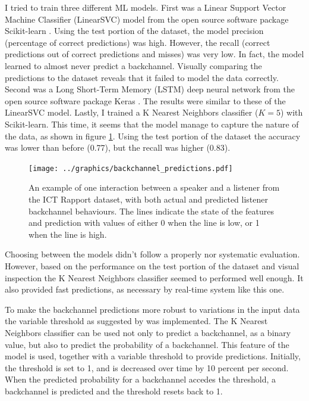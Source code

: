 \documentclass[]{simple-thesis}
\begin{document}
I tried to train three different ML models.
First was a Linear Support Vector Machine Classifier (LinearSVC) model from the open source software package Scikit-learn \citep{Pedregosa2011}.
Using the test portion of the dataset, the model precision (percentage of correct predictions) was high.
However, the recall (correct predictions out of correct predictions and misses) was very low.
In fact, the model learned to almost never predict a backchannel.
Visually comparing the predictions to the dataset reveals that it failed to model the data correctly.
Second was a Long Short-Term Memory (LSTM) deep neural network from the open source software package Keras \citep{Chollet2015}.
The results were similar to these of the LinearSVC model.
Lastly, I trained a K Nearest Neighbors classifier ($K = 5$) with Scikit-learn.
This time, it seems that the model manage to capture the nature of the data, as shown in figure \ref{fig:system:backchannel_predictions}.
Using the test portion of the dataset the accuracy was lower than before (0.77), but the recall was higher (0.83).

\begin{figure}
  \texttt{[image: ../graphics/backchannel\_predictions.pdf]}
  \caption{An example of one interaction between a speaker and a listener from the ICT Rapport dataset, with both actual and predicted listener backchannel behaviours. The lines indicate the state of the features and prediction with values of either 0 when the line is low, or 1 when the line is high.}
  \label{fig:system:backchannel_predictions}
\end{figure}

Choosing between the models didn't follow a properly nor systematic evaluation.
However, based on the performance on the test portion of the dataset and visual inspection the K Nearest Neighbors classifier seemed to performed well enough.
It also provided fast predictions, as necessary by real-time system like this one.

To make the backchannel predictions more robust to variations in the input data the variable threshold as suggested by \cite{Kok2012} was implemented.
The K Nearest Neighbors classifier can be used not only to predict a backchannel, as a binary value, but also to predict the probability of a backchannel.
This feature of the model is used, together with a variable threshold to provide predictions.
Initially, the threshold is set to 1, and is decreased over time by 10 percent per second.
When the predicted probability for a backchannel accedes the threshold, a backchannel is predicted and the threshold resets back to 1.
\end{document}
